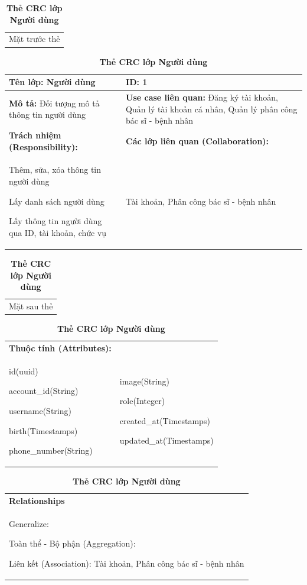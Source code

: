   \begin{table}[H]
    \caption{\bfseries \fontsize{12pt}{0pt}\selectfont Thẻ CRC lớp Người dùng}
    \centering
    \begin{tabularx}{0.9\textwidth}{X}
      Mặt trước thẻ
    \end{tabularx}
    \begin{tabularx}{0.9\textwidth}{|X|X|}
      \hline
      \textbf{Tên lớp:} Người dùng & \textbf{ID:} 1 \\
      \hline
      \textbf{Mô tả:} Đối tượng mô tả thông tin người dùng & \textbf{Use case liên quan:}  Đăng ký tài khoản, Quản lý tài khoản cá nhân, Quản lý phân công bác sĩ - bệnh nhân\\
      \hline
      \textbf{Trách nhiệm (Responsibility):} & \textbf{Các lớp liên quan (Collaboration):} \\
      Thêm, sửa, xóa thông tin người dùng 

      Lấy danh sách người dùng

      Lấy thông tin người dùng qua ID, tài khoản, chức vụ
      & 
      Tài khoản, Phân công bác sĩ - bệnh nhân
      \\
      \hline
    \end{tabularx}
    \begin{tabularx}{0.9\textwidth}{X}
      Mặt sau thẻ
    \end{tabularx}
    \begin{tabularx}{0.9\textwidth}{|X|X|}
      \hline
      \textbf{Thuộc tính (Attributes):} & \\
      id(uuid) 
      
      account\_id(String)

      username(String)

      birth(Timestamps)

      phone\_number(String)
      & 
      image(String) 
      
      role(Integer) 
      
      created\_at(Timestamps)

      updated\_at(Timestamps)
      \\
      \hline
    \end{tabularx}
    \begin{tabularx}{0.9\textwidth}{|X|}
      \textbf{Relationships} \\
      Generalize:  

      Toàn thể - Bộ phận (Aggregation):
      
      Liên kết (Association): Tài khoản, Phân công bác sĩ - bệnh nhân 
      \\
      \hline
    \end{tabularx}
  \end{table}

